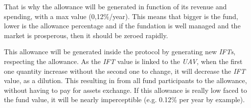 \documentclass[11pt]{scrartcl}
\begin{document}
    That is why the allowance will be generated in function of its revenue and
    spending, with a max value (0,12\%/year). This means that bigger is the fund,
    lower is the allowance percentage and if the fundation is well managed and the 
    market is prosperous, then it should be zeroed rapidly.

    This allowance will be generated inside the protocol by generating new \textit{IFTs}, 
    respecting the allowance. As the \textit{IFT} value is linked to the \textit{UAV}, 
    when the first one quantity increase without the second one to change, it will 
    decrease the \textit{IFT} value, as a dilution. This resulting in from all fund participants to the allowance, without having 
    to pay for assets exchange. If this allowance is really low faced to the 
    fund value, it will be nearly imperceptible (e.g. 0.12\% per year by example).
\end{document}
